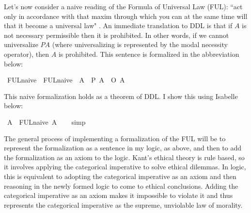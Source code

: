 \begin{isabellebody}
\begin{isamarkuptext}
Let's now consider a naive reading of the Formula of Universal Law (FUL): ``act only in accordance 
with that maxim through which you can at the same time will that it become a universal law" \citep{groundwork}.
An immediate translation to DDL is that if $A$ is not necessary permissible then it is prohibited. In other
words, if we cannot universalize $P A$ (where universalizing is represented by the modal necessity 
operator), then $A$ is prohibited. This sentence is formalized in the abbreviation below:%
\end{isamarkuptext}\isamarkuptrue%
\isamarkupfalse%
\ FUL{\isacharunderscore}naive\ \ {\isachardoublequoteopen}FUL{\isacharunderscore}naive\ {\isasymequiv}\ {\isasymlambda}A{\isachardot}\ {\isacharparenleft}{\isacharparenleft}\isactrlbold {\isasymnot}{\isacharparenleft}{\isasymbox}\ {\isacharparenleft}P\ A{\isacharparenright}{\isacharparenright}{\isacharparenright}\ \isactrlbold {\isasymrightarrow}\ {\isacharparenleft}O\ {\isacharbraceleft}{\isacharparenleft}\isactrlbold {\isasymnot}A{\isacharparenright}{\isacharbraceright}{\isacharparenright}{\isacharparenright}{\isachardoublequoteclose}\isanewline
%
%
\begin{isamarkuptext}%
This naive formalization holds as a theorem of DDL. I show this using Isabelle below:%
\end{isamarkuptext}\isamarkuptrue%
\isamarkupfalse%
\ {\isachardoublequoteopen}{\isasymforall}A{\isachardot}\ {\isasymTurnstile}\ {\isacharparenleft}FUL{\isacharunderscore}naive\ A{\isacharparenright}{\isachardoublequoteclose}\isanewline
%
\isadelimproof
\ \ %
\endisadelimproof
%
\isatagproof
{}\isamarkupfalse%
\ simp\isanewline
%
%
\endisatagproof
{\isafoldproof}%
%
\isadelimproof
%
\endisadelimproof
%
\begin{isamarkuptext}%
The general process of implementing a formalization of the FUL will be to represent the 
formalization as a sentence in my logic, as above, and then to add the formalization as an axiom to 
the logic. Kant's ethical theory is rule based, so it involves applying the categorical
imperative to solve ethical dilemmas. In logic, this is equivalent to adopting the categorical imperative as 
an axiom and then reasoning in the newly formed logic to come to ethical conclusions. Adding the categorical
imperative as an axiom makes it impossible to violate it and thus represents the categorical imperative
as the supreme, unviolable law of morality. 


\end{isamarkuptext}
\end{isabellebody}
